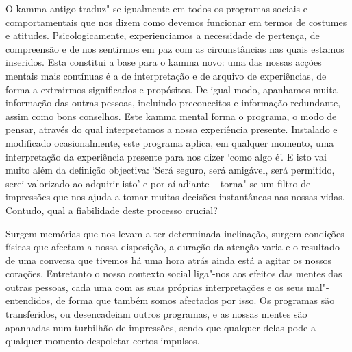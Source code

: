 O kamma antigo traduz"-se igualmente em todos os programas sociais e
comportamentais que nos dizem como devemos funcionar em termos de costumes e
atitudes. Psicologicamente, experienciamos a necessidade de pertença, de
compreensão e de nos sentirmos em paz com as circunstâncias nas quais estamos
inseridos. Esta constitui a base para o kamma novo: uma das nossas acções
mentais mais contínuas é a de interpretação e de arquivo de experiências, de
forma a extrairmos significados e propósitos. De igual modo, apanhamos muita
informação das outras pessoas, incluindo preconceitos e informação redundante,
assim como bons conselhos. Este kamma mental forma o programa, o modo de pensar,
através do qual interpretamos a nossa experiência presente. Instalado e
modificado ocasionalmente, este programa aplica, em qualquer momento, uma
interpretação da experiência presente para nos dizer `como algo é'. E isto vai
muito além da definição objectiva: `Será seguro, será amigável, será permitido,
serei valorizado ao adquirir isto' e por aí adiante -- torna"-se um filtro de
impressões que nos ajuda a tomar muitas decisões instantâneas nas nossas vidas.
Contudo, qual a fiabilidade deste processo crucial?

Surgem memórias que nos levam a ter determinada inclinação, surgem condições
físicas que afectam a nossa disposição, a duração da atenção varia e o resultado
de uma conversa que tivemos há uma hora atrás ainda está a agitar os nossos
corações. Entretanto o nosso contexto social liga"-nos aos efeitos das mentes das
outras pessoas, cada uma com as suas próprias interpretações e os seus
mal"-entendidos, de forma que também somos afectados por isso. Os programas são
transferidos, ou desencadeiam outros programas, e as nossas mentes são apanhadas
num turbilhão de impressões, sendo que qualquer delas pode a qualquer momento
despoletar certos impulsos.

